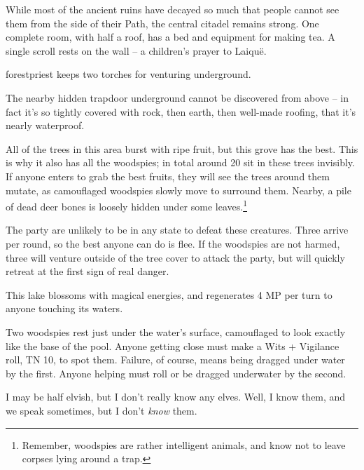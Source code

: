 \label{lost_city_map}

\begin{multicols}{2}

\label{lost_citadel}
While most of the ancient ruins have decayed so much that people cannot see them from the side of their Path, the central citadel remains strong.
One complete room,  with half a roof, has a bed and equipment for making tea.
A single scroll rests on the wall -- a children's prayer to Laiqu\"{e}.

\Gls{forestpriest} keeps two torches for venturing underground.

The nearby hidden trapdoor underground cannot be discovered from above -- in fact it's so tightly covered with rock, then earth, then well-made roofing, that it's nearly waterproof.


All of the trees in this area burst with ripe fruit, but this grove has the best.
This is why it also has all the woodspies; in total around 20 sit in these trees invisibly.
If anyone enters to grab the best fruits, they will see the trees around them mutate, as camouflaged woodspies slowly move to surround them.
Nearby, a pile of dead deer bones is loosely hidden under some leaves.\footnote{Remember, woodspies are rather intelligent animals, and know not to leave corpses lying around a trap.}

The party are unlikely to be in any state to defeat these creatures.  Three arrive per round, so the best anyone can do is flee.  If the woodspies are not harmed, three will venture outside of the tree cover to attack the party, but will quickly retreat at the first sign of real danger.



This lake blossoms with magical energies, and regenerates 4 MP per turn to anyone touching its waters.

Two woodspies rest just under the water's surface, camouflaged to look exactly like the base of the pool.
Anyone getting close must make a Wits + Vigilance roll, TN 10, to spot them.
Failure, of course, means being dragged under water by the first.
Anyone helping must roll or be dragged underwater by the second.


\begin{speechtext}
	I may be half elvish, but I don't really know any elves.  Well, I know them, and we speak sometimes, but I don't \emph{know} them.


\end{speechtext}
\end{multicols}
